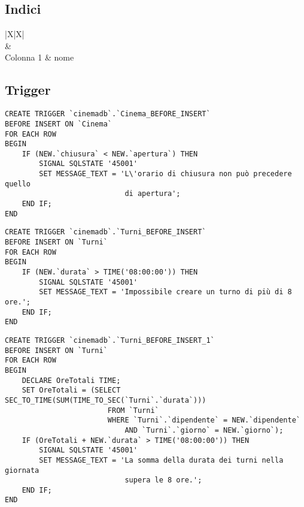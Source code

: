 \pagebreak

\subsection*{Indici}
%
%
\begin{tabularx}{\linewidth}{|X|X|}
    \hline
     \\\hline
     & 
    \\\hline
    Colonna 1
     & \textlangle{}nome\textrangle{}
    \\ \hline
\end{tabularx}

\pagebreak

\subsection*{Trigger}
%
%

\begin{verbatim}
CREATE TRIGGER `cinemadb`.`Cinema_BEFORE_INSERT`
BEFORE INSERT ON `Cinema`
FOR EACH ROW
BEGIN
    IF (NEW.`chiusura` < NEW.`apertura`) THEN
        SIGNAL SQLSTATE '45001'
        SET MESSAGE_TEXT = 'L\'orario di chiusura non può precedere quello
                            di apertura';
    END IF;
END
\end{verbatim}

\begin{verbatim}
CREATE TRIGGER `cinemadb`.`Turni_BEFORE_INSERT`
BEFORE INSERT ON `Turni`
FOR EACH ROW
BEGIN
    IF (NEW.`durata` > TIME('08:00:00')) THEN
        SIGNAL SQLSTATE '45001'
        SET MESSAGE_TEXT = 'Impossibile creare un turno di più di 8 ore.';
    END IF;
END
\end{verbatim}

\begin{verbatim}
CREATE TRIGGER `cinemadb`.`Turni_BEFORE_INSERT_1` 
BEFORE INSERT ON `Turni` 
FOR EACH ROW
BEGIN
    DECLARE OreTotali TIME;
    SET OreTotali = (SELECT SEC_TO_TIME(SUM(TIME_TO_SEC(`Turni`.`durata`)))
                        FROM `Turni`
                        WHERE `Turni`.`dipendente` = NEW.`dipendente`
                            AND `Turni`.`giorno` = NEW.`giorno`);
    IF (OreTotali + NEW.`durata` > TIME('08:00:00')) THEN
        SIGNAL SQLSTATE '45001'
        SET MESSAGE_TEXT = 'La somma della durata dei turni nella giornata
                            supera le 8 ore.';
    END IF;
END
\end{verbatim}

